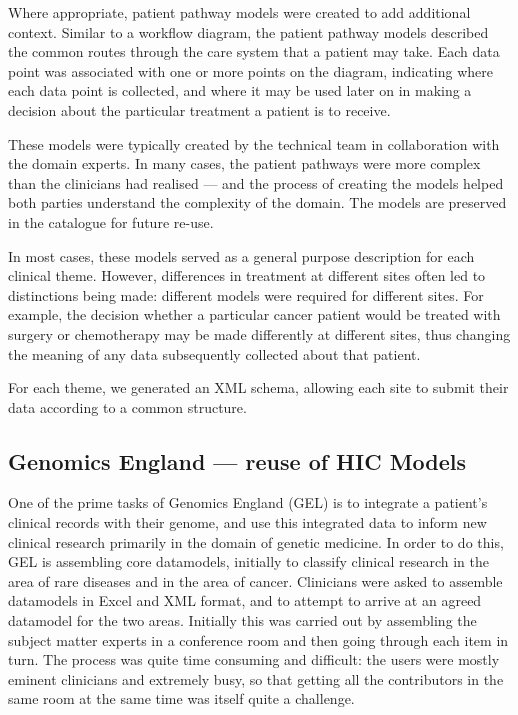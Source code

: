 Where appropriate, patient pathway models were created to add
additional context.  Similar to a workflow diagram, the patient
pathway models described the common routes through the care system
that a patient may take.  Each data point was associated with one or
more points on the diagram, indicating where each data point is
collected, and where it may be used later on in making a decision
about the particular treatment a patient is to receive.

These models were typically created by the technical team in
collaboration with the domain experts.  In many cases, the patient
pathways were more complex than the clinicians had realised --- and the
process of creating the models helped both parties understand the
complexity of the domain.  The models are preserved in the catalogue
for future re-use.

In most cases, these models served as a general purpose description
for each clinical theme.  However, differences in treatment at
different sites often led to distinctions being made: different models
were required for different sites.  For example, the decision whether
a particular cancer patient would be treated with surgery or
chemotherapy may be made differently at different sites, thus changing
the meaning of any data subsequently collected about that patient.

For each theme, we generated an XML schema, allowing each site to
submit their data according to a common structure.   


\subsection{Genomics England --- reuse of HIC Models}

One of the prime tasks of Genomics England (GEL) is to integrate a patient's clinical records with their genome, and use this integrated data to inform new clinical research primarily in the domain of genetic medicine. In order to do this, GEL is assembling core datamodels, initially to classify clinical research in the area of rare diseases and in the area of cancer.  Clinicians were asked to assemble datamodels in Excel and XML format, and to attempt to arrive at an agreed datamodel for the two areas.  Initially this was carried out by assembling the subject matter experts in a conference room and then going through each item in turn. The process was quite time consuming and difficult: the users were mostly eminent clinicians and extremely busy, so that getting all the contributors in the same room at the same time was itself quite a challenge.

